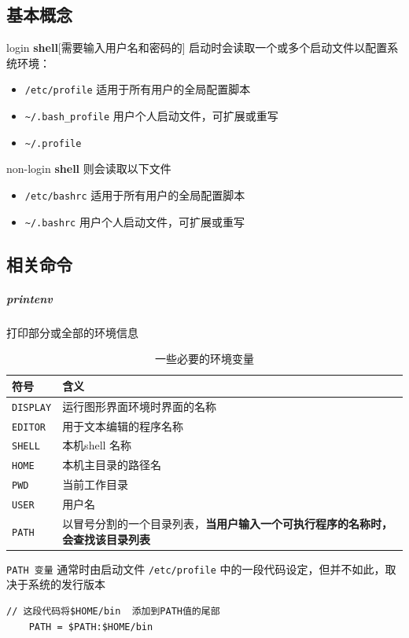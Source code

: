 \documentclass[UTF8,a4paper,12pt]{ctexbook}
\begin{document}
		\subsection{基本概念}
			login \textbf{shell}[需要输入用户名和密码的] 启动时会读取一个或多个启动文件以配置系统环境：
				\begin{itemize}[itemindent = 1em]
					\item \verb|/etc/profile| 适用于所有用户的全局配置脚本
					\item \verb|~/.bash_profile| 用户个人启动文件，可扩展或重写
					\item \verb|~/.profile|
				\end{itemize}
				
			non-login \textbf{shell} 则会读取以下文件
				\begin{itemize}[itemindent = 1em]
					\item \verb|/etc/bashrc| 适用于所有用户的全局配置脚本
					\item \verb|~/.bashrc| 用户个人启动文件，可扩展或重写
				\end{itemize}
		
		\subsection{相关命令}
		\subparagraph{printenv}打印部分或全部的环境信息
			\begin{table}[H]
				\centering
				\caption{一些必要的环境变量}
				\begin{tabular}{l|m{14cm}}
					\hline
					符号 	   	   & 含义\\
					\hline
					\verb|DISPLAY|		&  运行图形界面环境时界面的名称\\
					\verb|EDITOR|		&  用于文本编辑的程序名称\\
					\verb|SHELL|		&  本机shell 名称\\
					\verb|HOME|		&  本机主目录的路径名\\
					\verb|PWD|		&  当前工作目录\\
					\verb|USER|		&  用户名\\
					\verb|PATH|		&  以冒号分割的一个目录列表，\textbf{当用户输入一个可执行程序的名称时，会查找该目录列表}\\
					\hline
				\end{tabular}
			\end{table}	
			
			\verb|PATH 变量| 通常时由启动文件 \verb|/etc/profile| 中的一段代码设定，但并不如此，取决于系统的发行版本
			\begin{lstlisting}
// 这段代码将$HOME/bin  添加到PATH值的尾部
	PATH = $PATH:$HOME/bin
			\end{lstlisting}
			
\end{document}
